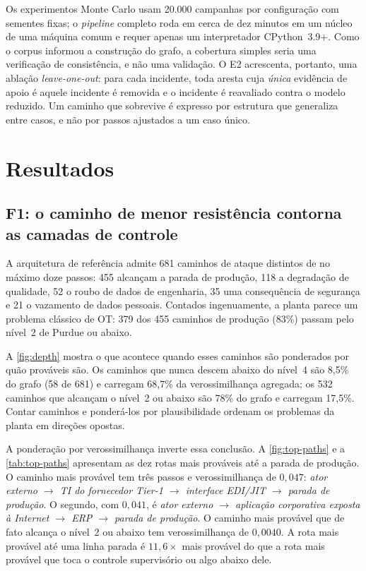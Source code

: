 Os experimentos Monte Carlo usam 20.000 campanhas por configuração com sementes
fixas; o \emph{pipeline} completo roda em cerca de dez minutos em um núcleo de
uma máquina comum e requer apenas um interpretador CPython~3.9+. Como o corpus
informou a construção do grafo, a cobertura simples seria uma verificação de
consistência, e não uma validação. O E2 acrescenta, portanto, uma ablação
\emph{leave-one-out}: para cada incidente, toda aresta cuja \emph{única}
evidência de apoio é aquele incidente é removida e o incidente é reavaliado
contra o modelo reduzido. Um caminho que sobrevive é expresso por estrutura que
generaliza entre casos, e não por passos ajustados a um caso único.

\section{Resultados}
\label{sec:resultados}

\subsection{F1: o caminho de menor resistência contorna as camadas de controle}

A arquitetura de referência admite 681 caminhos de ataque distintos de no
máximo doze passos: 455 alcançam a parada de produção, 118 a degradação de
qualidade, 52 o roubo de dados de engenharia, 35 uma consequência de segurança
e 21 o vazamento de dados pessoais. Contados ingenuamente, a planta parece um
problema clássico de OT: 379 dos 455 caminhos de produção (83\%) passam pelo
nível~2 de Purdue ou abaixo.

A \cref{fig:depth} mostra o que acontece quando esses caminhos são ponderados
por quão prováveis são. Os caminhos que nunca descem abaixo do nível~4 são 8,5\% do grafo (58 de 681) e carregam 68,7\% da verossimilhança agregada;
os 532 caminhos que alcançam o nível~2 ou abaixo são 78\% do grafo e carregam
17,5\%. Contar caminhos e ponderá-los por plausibilidade ordenam os problemas da
planta em direções opostas.



A ponderação por verossimilhança inverte essa conclusão. A
\cref{fig:top-paths} e a \cref{tab:top-paths} apresentam as dez rotas mais
prováveis até a parada de produção. O caminho mais provável tem três passos e
verossimilhança de $0{,}047$: \emph{ator externo $\to$ TI do fornecedor Tier-1
$\to$ interface EDI/JIT $\to$ parada de produção}. O segundo, com $0{,}041$, é
\emph{ator externo $\to$ aplicação corporativa exposta à Internet $\to$ ERP
$\to$ parada de produção}. O caminho mais provável que de fato alcança o
nível~2 ou abaixo tem verossimilhança de $0{,}0040$. A rota mais provável até uma linha parada é
$11{,}6\times$ mais provável do que a rota mais provável
que toca o controle supervisório ou algo abaixo dele.

